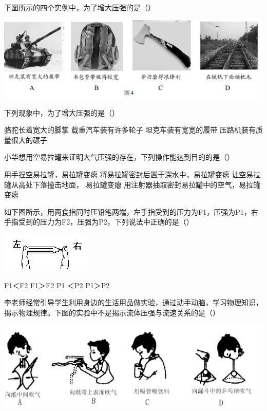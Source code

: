 \documentclass[12pt]{exam}%
\begin{document}
\begin{Aquestions}
\begin{questions}
\question
下图所示的四个实例中，为了增大压强的是（\answerline*[C]）

\includegraphics[scale=1]{figures/图片4.png} 


\question
下列现象中，为了增大压强的是（\answerline*[D]）
\begin{choices}
\choice 骆驼长着宽大的脚掌
\choice 载重汽车装有许多轮子
\choice 坦克车装有宽宽的履带
\choice 压路机装有质量很大的碾子
\end{choices}


\question
小华想用空易拉罐来证明大气压强的存在，下列操作能达到目的的是（\answerline*[D]）
\begin{choices}
\choice 用手捏空易拉罐，易拉罐变瘪
\choice 将易拉罐密封后置于深水中，易拉罐变瘪
\choice 让空易拉罐从高处下落撞击地面， 易拉罐变瘪
\choice 用注射器抽取密封易拉罐中的空气，易拉罐变瘪
\end{choices}


\question
如下图所示，用两食指同时压铅笔两端，左手指受到的压力为F1，压强为P1，右手指受到的压力为F2，压强为P2，下列说法中正确的是（\answerline*[C]）
\begin{multicols}{2}
\includegraphics[scale=1]{figures/图片7.png} 
\columnbreak
\begin{choices}
\choice F1＜F2
\choice F1＞F2
\choice P1 ＜P2
\choice P1＞P2
\end{choices}
\end{multicols}


\question
李老师经常引导学生利用身边的生活用品做实验，通过动手动脑，学习物理知识，揭示物理规律。下图的实验中不是揭示流体压强与流速关系的是（\answerline*[C]）

\includegraphics[width=\linewidth]{figures/图片8.png} 



\end{questions}
\end{Aquestions}
\end{document}

